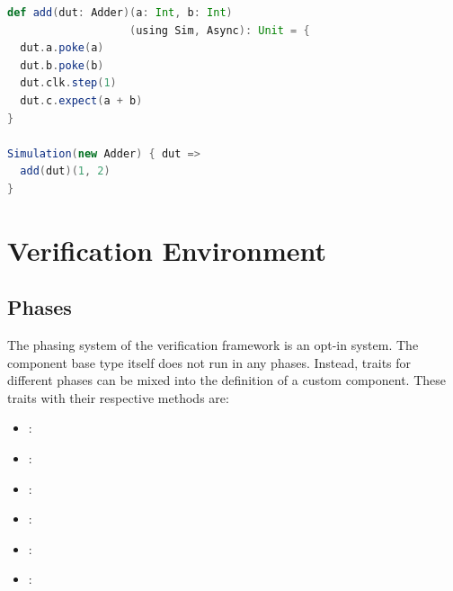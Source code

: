 \begin{listing}
\begin{lstlisting}[language=scala, captionpos=b, caption=Example code for a function using the simulation context to interact with a DUT.,label=lst:simctx]
def add(dut: Adder)(a: Int, b: Int)
                   (using Sim, Async): Unit = {
  dut.a.poke(a)
  dut.b.poke(b)
  dut.clk.step(1)
  dut.c.expect(a + b)
}

Simulation(new Adder) { dut =>
  add(dut)(1, 2)
}
\end{lstlisting}
\end{listing}

\section{Verification Environment} %

\subsection{Phases} %

The phasing system of the verification framework is an opt-in system. The component base type itself does not run in
any phases. Instead, traits for different phases can be mixed into the definition of a custom component. These traits
with their respective methods are:

\begin{itemize}
  \item {}: \\ 
  \item {}: \\ 
  \item {}: \\ 
  \item {}: \\ 
  \item {}: \\ 
  \item {}: \\ 
\end{itemize}

